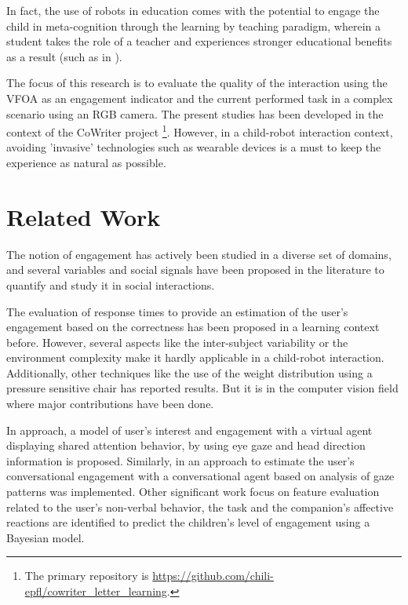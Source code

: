 \documentclass{sig-alternate}
\begin{document}
In fact, the use of robots in education comes with the potential to engage the child in meta-cognition through the learning by teaching paradigm, wherein a student takes the role of
a teacher and experiences stronger educational benefits as a result (such as in \cite{Palinscar1984}).

The focus of this research is to evaluate the quality of the interaction using the VFOA as an engagement indicator and the current performed task in a complex scenario using an RGB camera. The present studies has been developed in the context of the CoWriter project \footnote{The primary repository is \url{https://github.com/chili-epfl/cowriter_letter_learning}.}. However, in a child-robot interaction context, avoiding 'invasive' technologies such as wearable devices is a must to keep the experience as natural as possible. 

\section{Related Work}

The notion of engagement has actively been studied in a diverse set of domains, and several variables and social signals have been proposed in the literature to quantify and study it in social interactions.

The evaluation of response times to provide an estimation of the user's engagement based on the correctness has been proposed in a learning context \cite{Beck} before. However, several aspects like the inter-subject variability or the environment complexity make it hardly applicable in a child-robot interaction. Additionally, other techniques \cite{Chipman07postureas} like the use of the weight distribution using a pressure sensitive chair has reported results. But it is in the computer vision field where major contributions have been done. 

In \cite{peters2010investigating} approach, a model of user's interest and engagement with a virtual agent displaying shared attention behavior, by using eye gaze and head direction information is proposed. Similarly, in \cite{nakano2010estimating} an approach to estimate the user's conversational engagement with a conversational agent based on analysis of gaze patterns was implemented. Other significant work \cite{Castellano:2009} focus on feature evaluation related to the user's non-verbal behavior, the task and the companion's affective reactions are identified to predict the children's level of engagement using a Bayesian model.
\end{document}
